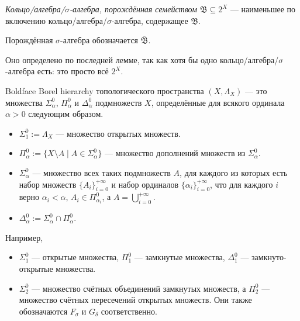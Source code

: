 \documentclass[12pt,a4paper]{article}
\begin{document}
    \begin{definition}
        \emph{Кольцо/алгебра/$\sigma$-алгебра, порождённая семейством $\mathfrak{B} \subseteq 2^X$} --- наименьшее по включению кольцо/алгебра/$\sigma$-алгебра, содержащее $\mathfrak{B}$.

        Порождённая $\sigma$-алгебра обозначается $\overline{\mathfrak{B}}$.
    \end{definition}

    \begin{remark}
        Оно определено по последней лемме, так как хотя бы одно кольцо/алгебра/$\sigma$-алгебра есть: это просто всё $2^X$.
    \end{remark}

    \begin{definition}
        Boldface Borel hierarchy топологического пространства $(X, \Lambda_X)$ --- это множества $\Sigma^0_\alpha$, $\Pi^0_\alpha$ и $\Delta^0_\alpha$ подмножеств $X$, определённые для всякого ординала $\alpha > 0$ следующим образом.
        \begin{itemize}
            \item $\Sigma^0_1 := \Lambda_X$ --- множество открытых множеств.
            \item $\Pi^0_\alpha := \{X \setminus A \mid A \in \Sigma^0_\alpha\}$ --- множество дополнений множеств из $\Sigma^0_\alpha$.
            \item $\Sigma^0_\alpha$ --- множество всех таких подмножеств $A$, для каждого из которых есть набор множеств $\{A_i\}_{i=0}^{+\infty}$ и набор ординалов $\{\alpha_i\}_{i=0}^{+\infty}$, что для каждого $i$ верно $\alpha_i < \alpha$, $A_i \in \Pi^0_{\alpha_i}$, а $A = \bigcup_{i=0}^{+\infty}$.
            \item $\Delta^0_\alpha := \Sigma^0_\alpha \cap \Pi^0_\alpha$.
        \end{itemize}

        Например,
        \begin{itemize}
            \item $\Sigma^0_1$ --- открытые множества, $\Pi^0_1$ --- замкнутые множества, $\Delta^0_1$ --- замкнуто-открытые множества.
            \item $\Sigma^0_2$ --- множество счётных объединений замкнутых множеств, а $\Pi^0_2$ --- множество счётных пересечений открытых множеств. Они также обозначаются $F_\sigma$ и $G_\delta$ соответственно.
        \end{itemize}
    \end{definition}
\end{document}
